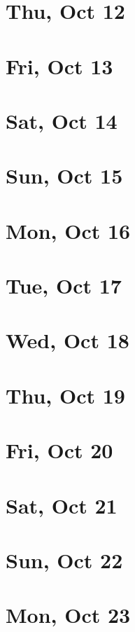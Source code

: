 	\section{Thu, Oct 12}
		
	\section{Fri, Oct 13}
		
	\section{Sat, Oct 14}
		
	\section{Sun, Oct 15}
		
	\section{Mon, Oct 16}
		
	\section{Tue, Oct 17}
		
	\section{Wed, Oct 18}
		
	\section{Thu, Oct 19}
		
	\section{Fri, Oct 20}
		
	\section{Sat, Oct 21}
		
	\section{Sun, Oct 22}
		
	\section{Mon, Oct 23}
		
